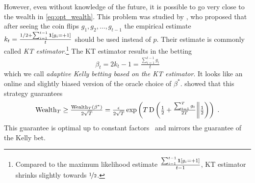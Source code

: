 However, even without knowledge of the future, it is possible to go very close
to the wealth in \eqref{eq:opt_wealth}.  This problem was studied by
\citet{Krichevsky-Trofimov-1981}, who proposed that after seeing the coin flips
$g_1, g_2, \dots, g_{t-1}$ the empirical estimate $k_t = \frac{1/2 +
\sum_{i=1}^{t-1} \mathbf{1}[g_i = +1]}{t}$ should be used instead of $p$. Their
estimate is commonly called \emph{KT estimator}.\footnote{Compared to the
maximum likelihood estimate $\frac{\sum_{i=1}^{t-1} \mathbf{1}[g_i =
+1]}{t-1}$, KT estimator shrinks slightly towards $\nicefrac{1}{2}$.} The KT
estimator results in the betting
\begin{equation}
\label{equation:kt-estimator-betting-strategy}
\beta_t = 2k_t - 1 = \tfrac{\sum_{i=1}^{t-1} g_i}{t}
\end{equation}
which we call \emph{adaptive Kelly betting based on the KT estimator}. It looks like
an online and slightly biased version of the oracle choice of $\beta^*$.
\citeauthor{Krichevsky-Trofimov-1981} showed that this strategy guarantees
\[
\operatorname{Wealth}_T \ge \tfrac{\operatorname{Wealth}_T(\beta^*)}{2\sqrt{T}}
= \tfrac{\epsilon}{2\sqrt{T}} \exp\left(T \operatorname{D}\left({\tfrac{1}{2}+\tfrac{\sum_{t=1}^T g_t}{2T}}\middle\|{\tfrac{1}{2}}\right)\right)\; .
\]
This guarantee is optimal up to constant
factors~\citep{Cesa-Bianchi-Lugosi-2006} and mirrors the guarantee of the Kelly
bet.

